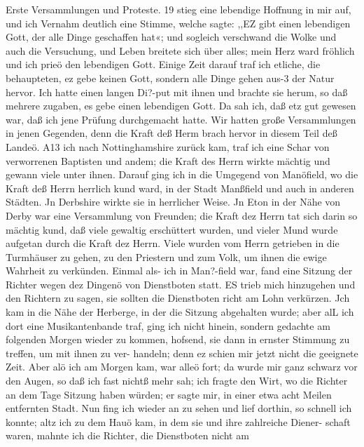 Erste Versammlungen und Proteste. 19
stieg eine lebendige Hoffnung in mir auf, und ich Vernahm deutlich
eine Stimme, welche sagte: ,,EZ gibt einen lebendigen Gott, der
alle Dinge geschaffen hat«; und sogleich verschwand die Wolke
und auch die Versuchung, und Leben breitete sich über alles; mein
Herz ward fröhlich und ich prieö den lebendigen Gott. Einige
Zeit darauf traf ich etliche, die behaupteten, ez gebe keinen Gott,
sondern alle Dinge gehen aus-3 der Natur hervor. Ich hatte einen
langen Di?-put mit ihnen und brachte sie herum, so daß mehrere
zugaben, es gebe einen lebendigen Gott. Da sah ich, daß etz gut
gewesen war, daß ich jene Prüfung durchgemacht hatte. Wir
hatten große Versammlungen in jenen Gegenden, denn die Kraft
deß Herm brach hervor in diesem Teil deß Landeö. A13 ich nach
Nottinghamshire zurück kam, traf ich eine Schar von verworrenen
Baptisten und andem; die Kraft des Herrn wirkte mächtig und
gewann viele unter ihnen. Darauf ging ich in die Umgegend von
Manöfield, wo die Kraft deß Herrn herrlich kund ward, in der
Stadt Manßfield und auch in anderen Städten. Jn Derbshire
wirkte sie in herrlicher Weise. Jn Eton in der Nähe von Derby
war eine Versammlung von Freunden; die Kraft dez Herrn tat sich
darin so mächtig kund, daß viele gewaltig erschüttert wurden, und
vieler Mund wurde aufgetan durch die Kraft dez Herrn. Viele wurden
vom Herrn getrieben in die Turmhäuser zu gehen, zu den Priestern
und zum Volk, um ihnen die ewige Wahrheit zu verkünden.
Einmal als- ich in Man?-field war, fand eine Sitzung der
Richter wegen dez Dingenö von Dienstboten statt. ES trieb
mich hinzugehen und den Richtern zu sagen, sie sollten die
Dienstboten richt am Lohn verkürzen. Jch kam in die Nähe
der Herberge, in der die Sitzung abgehalten wurde; aber
alL ich dort eine Musikantenbande traf, ging ich nicht hinein,
sondern gedachte am folgenden Morgen wieder zu kommen, hofsend,
sie dann in ernster Stimmung zu treffen, um mit ihnen zu ver-
handeln; denn ez schien mir jetzt nicht die geeignete Zeit. Aber
alö ich am Morgen kam, war alleö fort; da wurde mir ganz
schwarz vor den Augen, so daß ich fast nichtß mehr sah; ich fragte
den Wirt, wo die Richter an dem Tage Sitzung haben würden;
er sagte mir, in einer etwa acht Meilen entfernten Stadt. Nun
fing ich wieder an zu sehen und lief dorthin, so schnell ich konnte;
altz ich zu dem Hauö kam, in dem sie und ihre zahlreiche Diener-
schaft waren, mahnte ich die Richter, die Dienstboten nicht am


